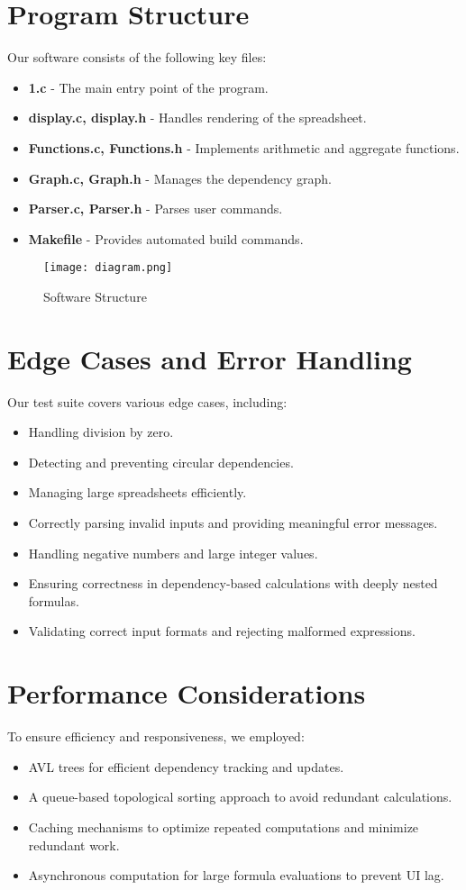 \documentclass{article}
\begin{document}
\section{Program Structure}
Our software consists of the following key files:
\begin{itemize}
    \item \textbf{1.c} - The main entry point of the program.
    \item \textbf{display.c, display.h} - Handles rendering of the spreadsheet.
    \item \textbf{Functions.c, Functions.h} - Implements arithmetic and aggregate functions.
    \item \textbf{Graph.c, Graph.h} - Manages the dependency graph.
    \item \textbf{Parser.c, Parser.h} - Parses user commands.
    \item \textbf{Makefile} - Provides automated build commands.
\end{itemize}

\begin{figure}[h]
    \centering
    \texttt{[image: diagram.png]}
    \caption{Software Structure}
    \label{fig:diagram}
\end{figure}

\section{Edge Cases and Error Handling}
Our test suite covers various edge cases, including:
\begin{itemize}
    \item Handling division by zero.
    \item Detecting and preventing circular dependencies.
    \item Managing large spreadsheets efficiently.
    \item Correctly parsing invalid inputs and providing meaningful error messages.
    \item Handling negative numbers and large integer values.
    \item Ensuring correctness in dependency-based calculations with deeply nested formulas.
    \item Validating correct input formats and rejecting malformed expressions.
\end{itemize}

\section{Performance Considerations}
To ensure efficiency and responsiveness, we employed:
\begin{itemize}
    \item AVL trees for efficient dependency tracking and updates.
    \item A queue-based topological sorting approach to avoid redundant calculations.
    \item Caching mechanisms to optimize repeated computations and minimize redundant work.
    \item Asynchronous computation for large formula evaluations to prevent UI lag.
\end{itemize}
\end{document}
